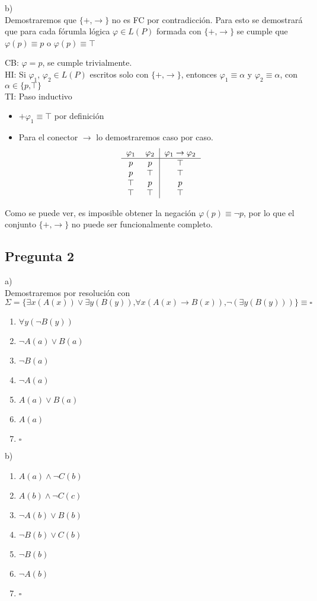 \documentclass[12pt]{article}
\begin{document}
b)\\

Demostraremos que $\{+\textrm{,}\rightarrow\}$ no es FC por contradicción. Para esto se demostrará que para cada fórumla lógica $\varphi \in L(P)$ formada con $\{+\textrm{,}\rightarrow\}$ se cumple que $\varphi(p) \equiv p$ o $\varphi(p) \equiv  \top$

CB: $\varphi = p$, se cumple trivialmente. \\
HI: Si $\varphi_1$, $\varphi_2 \in L(P)$ escritos solo con $\{+\textrm{,}\rightarrow\}$, entonces $\varphi_1 \equiv \alpha$ y $\varphi_2 \equiv \alpha$, con $\alpha \in \{p \textrm{,}\top \}$\\
TI: Paso inductivo
\begin{itemize}
  \item $+\varphi_1 \equiv \top$ por definición\\
  \item Para el conector $\rightarrow$ lo demostraremos caso por caso.
\[
\begin{tabular}{cc|c}
$\varphi_1$ & $\varphi_2$ & $\varphi_1\rightarrow\varphi_2$ \\
\hline
$p$ & $p$ & $\top$ \\
$p$ & $\top$ & $\top$ \\
$\top$ & $p$ & $p$ \\
$\top$ & $\top$ & $\top$\\
\end{tabular}
\]
\end{itemize}

Como se puede ver, es imposible obtener la negación $\varphi(p)\equiv\neg p$, por lo que el conjunto $\{+\textrm{,}\rightarrow\}$ no puede ser funcionalmente completo.

\newpage
\subsection*{Pregunta 2}

a)\\

Demostraremos por resolución con $\Sigma = \{\exists x (A(x)) \vee \exists y (B(y)) \textrm{,}\forall x (A(x) \rightarrow B(x)) \textrm{,} \neg(\exists y (B(y)))\} \equiv \square$

\begin{enumerate}[label={(\arabic*)}]
\item $\forall y(\neg B(y))$
\item $\neg A(a) \vee B(a)$
\item $\neg B(a)$
\item $\neg A(a)$
\item $A(a) \vee B(a)$
\item $A(a)$
\item $\square$
\end{enumerate}


b)\\
\begin{enumerate}[label={(\arabic*)}]
\item $A(a)\wedge \neg C(b)$
\item $A(b)\wedge \neg C(c)$
\item $\neg A(b) \vee B(b)$
\item $\neg B(b) \vee C(b)$
\item $\neg B(b)$
\item $\neg A(b)$
\item $\square$
\end{enumerate}


\end{document}
